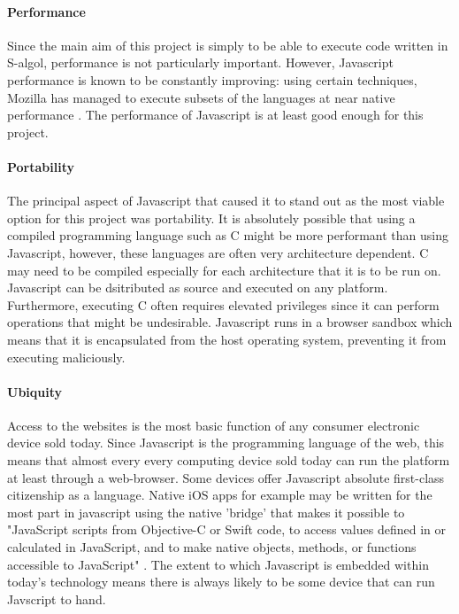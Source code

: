 \documentclass{article}
\begin{document}
\paragraph{Performance} Since the main aim of this project is simply to be able to execute code written in S-algol, performance is not particularly important. However, Javascript performance is known to be constantly improving: using certain techniques, Mozilla has managed to execute subsets of the languages at near native performance \cite{moz}. The performance of Javascript is at least good enough for this project. 

\paragraph{Portability} The principal aspect of Javascript that caused it to stand out as the most viable option for this project was portability. It is absolutely possible that using a compiled programming language such as C might be more performant than using Javascript, however, these languages are often very architecture dependent. C may need to be compiled especially for each architecture that it is to be run on. Javascript can be dsitributed as source and executed on any platform. Furthermore, executing C often requires elevated privileges since it can perform operations that might be undesirable. Javascript runs in a browser sandbox which means that it is encapsulated from the host operating system, preventing it from executing maliciously.

\paragraph{Ubiquity} Access to the websites is the most basic function of any consumer electronic device sold today. Since Javascript is the programming language of the web, this means that almost every every computing device sold today can run the platform at least through a web-browser. Some devices offer Javascript absolute first-class citizenship as a language. Native iOS apps for example may be written for the most part in javascript using the native 'bridge' that makes it possible to "JavaScript scripts from Objective-C or Swift code, to access values defined in or calculated in JavaScript, and to make native objects, methods, or functions accessible to JavaScript" \cite{apple}. The extent to which Javascript is embedded within today's technology means there is always likely to be some device that can run Javscript to hand.
\end{document}
